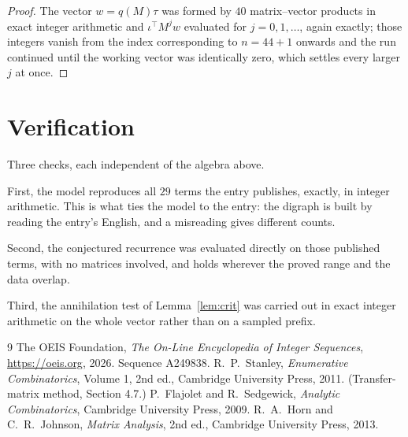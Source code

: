 \documentclass[11pt,a4paper]{article}
\theoremstyle{plain}
\theoremstyle{definition}
\begin{document}
\begin{proof}
The vector $w=q(M)\tau$ was formed by $40$ matrix--vector products in exact integer
arithmetic and $\iota^{\!\top}M^{j}w$ evaluated for $j=0,1,\dots$, again exactly; those
integers vanish from the index corresponding to $n=44+1$ onwards and the run continued
until the working vector was identically zero, which settles every larger $j$ at once.
\end{proof}

\section{Verification}

Three checks, each independent of the algebra above.

First, the model reproduces all $29$ terms the entry publishes, exactly, in integer
arithmetic. This is what ties the model to the entry: the digraph is built by reading the
entry's English, and a misreading gives different counts.

Second, the conjectured recurrence was evaluated directly on those published terms, with no
matrices involved, and holds wherever the proved range and the data overlap.

Third, the annihilation test of Lemma~\ref{lem:crit} was carried out in exact integer
arithmetic on the whole vector rather than on a sampled prefix.

\begin{thebibliography}{9}
 The OEIS Foundation, \emph{The On-Line Encyclopedia of Integer
Sequences}, \url{https://oeis.org}, 2026. Sequence A249838.
 R.~P.~Stanley, \emph{Enumerative Combinatorics}, Volume 1, 2nd ed.,
Cambridge University Press, 2011. (Transfer-matrix method, Section 4.7.)
 P.~Flajolet and R.~Sedgewick, \emph{Analytic Combinatorics}, Cambridge
University Press, 2009.
 R.~A.~Horn and C.~R.~Johnson, \emph{Matrix Analysis}, 2nd ed., Cambridge
University Press, 2013.
\end{thebibliography}
\end{document}
